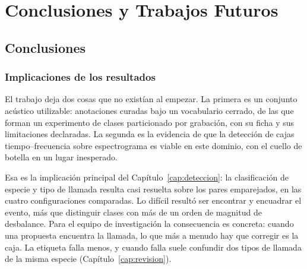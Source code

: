 \chapter{Conclusiones y Trabajos Futuros}
\label{cap:conclusiones}

%
%

\section{Conclusiones}
\label{sec:conclusiones}

\subsection{Implicaciones de los resultados}

El trabajo deja dos cosas que no existían al empezar. La primera es un conjunto
acústico utilizable: \nAnnotations{} anotaciones curadas bajo un vocabulario cerrado, de
las que \nExperiment{} forman un experimento de \nClasses{} clases particionado
por grabación, con su ficha y sus limitaciones declaradas. La segunda es la
evidencia de que la detección de cajas tiempo--frecuencia sobre espectrograma es
viable en este dominio, con el cuello de botella en un lugar inesperado.

Esa es la implicación principal del Capítulo~\ref{cap:deteccion}: la
clasificación de especie y tipo de llamada resulta casi resuelta sobre los pares
emparejados, en las cuatro configuraciones comparadas. Lo difícil resultó ser encontrar y encuadrar el evento, más que distinguir
\nClasses{} clases con más de un orden de magnitud de desbalance. Para el equipo
de investigación la consecuencia es concreta: cuando una propuesta encuentra la
llamada, lo que más a menudo hay que corregir es la caja. La etiqueta falla menos,
y cuando falla suele confundir dos tipos de llamada de la misma especie
(Capítulo~\ref{cap:revision}).


